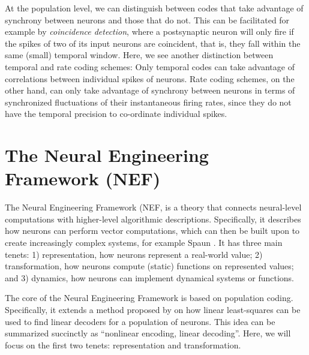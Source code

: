 At the population level,
we can distinguish between codes that take advantage of synchrony between neurons
and those that do not.
This can be facilitated for example by \emph{coincidence detection},
where a postsynaptic neuron will only fire if the spikes of two
of its input neurons are coincident,
that is, they fall within the same (small) temporal window.
Here, we see another distinction between temporal and rate coding schemes:
Only temporal codes can take advantage of correlations
between individual spikes of neurons.
Rate coding schemes, on the other hand,
can only take advantage of synchrony between neurons in terms of
synchronized fluctuations of their instantaneous firing rates,
since they do not have the temporal precision to co-ordinate individual spikes.






\section{The Neural Engineering Framework (NEF)}

The Neural Engineering Framework (NEF, \textcite{Eliasmith2003}
is a theory that connects neural-level computations
with higher-level algorithmic descriptions.
Specifically, it describes how neurons can perform vector computations,
which can then be built upon to create increasingly complex systems,
for example Spaun \parencite{Eliasmith2012}.
It has three main tenets:
1) representation, how neurons represent a real-world value;
2) transformation, how neurons compute (static) functions on represented values;
and 3) dynamics, how neurons can implement dynamical systems or functions.

The core of the Neural Engineering Framework is based on population coding.
Specifically, it extends a method proposed by \textcite{Salinas1994}
on how linear least-squares can be used to find linear decoders for a
population of neurons.
This idea can be summarized succinctly as
``nonlinear encoding, linear decoding''.
Here, we will focus on the first two tenets: representation and transformation.


